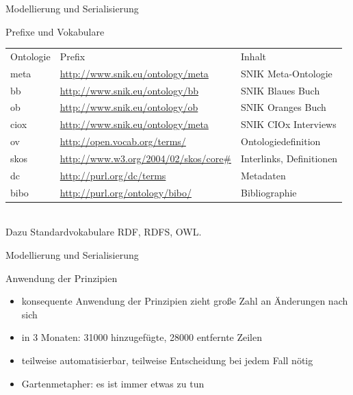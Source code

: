 \documentclass[14pt,aspectratio=1610]{beamer}
\begin{document}
\begin{frame}{Modellierung und Serialisierung}
\begin{block}{Prefixe und Vokabulare}
\small
{
\begin{tabular}{l>{\footnotesize}ll}
Ontologie	&Prefix						&Inhalt\\
meta		&\url{http://www.snik.eu/ontology/meta}		&SNIK Meta-Ontologie\\
bb		&\url{http://www.snik.eu/ontology/bb}		&SNIK Blaues Buch\\
ob		&\url{http://www.snik.eu/ontology/ob}		&SNIK Oranges Buch\\
ciox		&\url{http://www.snik.eu/ontology/meta}		&SNIK CIOx Interviews\\
ov		&\url{http://open.vocab.org/terms/}		&Ontologiedefinition\\
skos		&\url{http://www.w3.org/2004/02/skos/core\#}	&Interlinks, Definitionen\\
dc		&\url{http://purl.org/dc/terms}			&Metadaten\\
bibo		&\url{http://purl.org/ontology/bibo/}		&Bibliographie\\
\end{tabular}
}
~\\
Dazu Standardvokabulare RDF, RDFS, OWL.
\end{block}
\end{frame}

\begin{frame}{Modellierung und Serialisierung}
\begin{block}{Anwendung der Prinzipien}
\begin{itemize}
\item konsequente Anwendung der Prinzipien zieht große Zahl an Änderungen nach sich
\item in 3 Monaten: 31000 hinzugefügte, 28000 entfernte Zeilen
\item teilweise automatisierbar, teilweise Entscheidung bei jedem Fall nötig
\item Gartenmetapher: es ist immer etwas zu tun
\end{itemize}
\end{block}
\end{frame}
\end{document}
